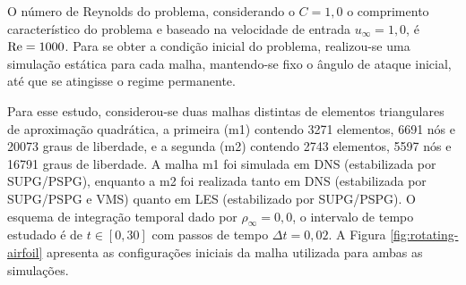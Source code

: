 O número de Reynolds do problema, considerando o $C=1,0$ o comprimento característico do problema e baseado na velocidade de entrada $u_\infty=1,0$, é $\mathrm{Re}=1000$. Para se obter a condição inicial do problema, realizou-se uma simulação estática para cada malha, mantendo-se fixo o ângulo de ataque inicial, até que se atingisse o regime permanente.

Para esse estudo, considerou-se duas malhas distintas de elementos triangulares de aproximação quadrática, a primeira (m1) contendo 3271 elementos, 6691 nós e 20073 graus de liberdade, e a segunda (m2) contendo 2743 elementos, 5597 nós e 16791 graus de liberdade. A malha m1 foi simulada em DNS (estabilizada por SUPG/PSPG), enquanto a m2 foi realizada tanto em DNS (estabilizada por SUPG/PSPG e VMS) quanto em LES (estabilizado por SUPG/PSPG). O esquema de integração temporal dado por $\rho_\infty=0,0$, o intervalo de tempo estudado é de $t\in[0,30]$ com passos de tempo $\Delta t=0,02$. A Figura \ref{fig:rotating-airfoil} apresenta as configurações iniciais da malha utilizada para ambas as simulações.

